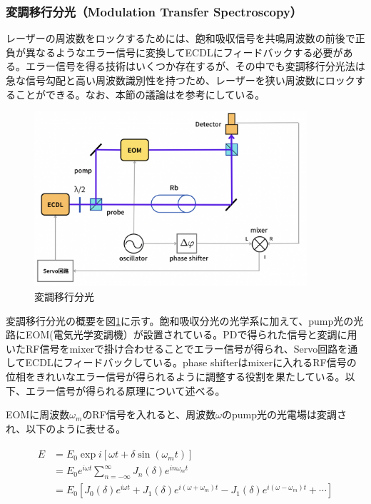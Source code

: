 \documentclass[dvipdfmx]{jsarticle}
\begin{document}
\subsubsection{変調移行分光（Modulation Transfer Spectroscopy）}
レーザーの周波数をロックするためには、飽和吸収信号を共鳴周波数の前後で正負が異なるようなエラー信号に変換してECDLにフィードバックする必要がある。エラー信号を得る技術はいくつか存在するが、その中でも変調移行分光法は急な信号勾配と高い周波数識別性を持つため、レーザーを狭い周波数にロックすることができる。なお、本節の議論は\cite{mt}\cite{mt2}を参考にしている。

\begin{figure}
\centering
\includegraphics[width=0.9\textwidth]{images/mt.png}
\caption{\label{fig:mt}変調移行分光}
\end{figure}

変調移行分光の概要を図\ref{fig:mt}に示す。飽和吸収分光の光学系に加えて、pump光の光路にEOM(電気光学変調機）が設置されている。PDで得られた信号と変調に用いたRF信号をmixerで掛け合わせることでエラー信号が得られ、Servo回路を通してECDLにフィードバックしている。phase shifterはmixerに入れるRF信号の位相をきれいなエラー信号が得られるように調整する役割を果たしている。以下、エラー信号が得られる原理について述べる。

EOMに周波数$\omega_m$のRF信号を入れると、周波数$\omega$のpump光の光電場は変調され、以下のように表せる。

\begin{align}
\begin{split}
    E &= 
        E_0 \exp i \left[{\omega t + \delta \sin{(\omega_m t)}} \right] \\
    &= E_0e^{i\omega t} \sum_{n = -\infty}^\infty J_n(\delta) e^{in\omega_m t} \\
    &= E_0 \left[ J_0(\delta)e^{i\omega t} + J_1(\delta)e^{i(\omega + \omega_m)t} - J_1(\delta)e^{i(\omega - \omega_m)t} + \cdots \right]
\end{split}
\end{align}
\end{document}

